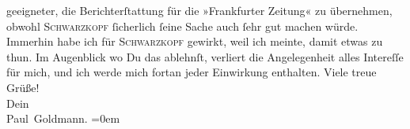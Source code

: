 \begin{ledgroupsized}[t]{13cm}
               geeigneter, die Berichterſtattung für die »Frankfurter
                  Zeitung« zu übernehmen, obwohl \textsc{Schwarzkopf} ſicherlich ſeine Sache auch ſehr gut machen würde. Immerhin {\pb}habe ich für \textsc{Schwarzkopf} gewirkt, weil ich meinte, damit etwas \label{K_L02898-11v}\label{K_L02898-11h} zu thun. Im Augenblick wo Du das ablehnſt, verliert die Angelegenheit alles
               Intereſſe für mich, und ich werde mich fortan jeder Einwirkung enthalten.\pend
           \pstart
           Viele treue Grüße! {\\[\baselineskip]}Dein {\\[\baselineskip]}\spacefill\mbox{Paul Goldmann.}\pend
           \leftskip=0em{}
         
         \endnumbering{}\end{ledgroupsized}  \newcommand{\dateiname}{L02898}\newcommand{\titel}{Paul Goldmann an Arthur Schnitzler, 11. 12. [1899]}\newcommand{\editorInnen}{Martin Anton Müller und Laura Untner}
      